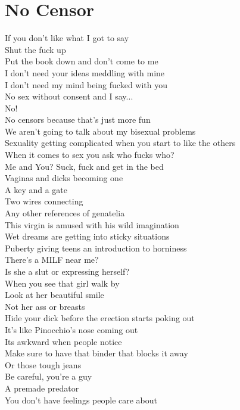 \documentclass[12pt, b5paper, oneside]{book}
\begin{document}
\section{No Censor}
If you don't like what I got to say
\\Shut the fuck up
\\Put the book down and don't come to me
\\I don't need your ideas meddling with mine
\\I don't need my mind being fucked with you
\\No sex without consent and I say...
\\No!
\\No censors because that's just more fun
\\We aren't going to talk about my bisexual problems
\\Sexuality getting complicated when you start to like the others
\\When it comes to sex you ask who fucks who?
\\Me and You? Suck, fuck and get in the bed
\\Vaginas and dicks becoming one
\\A key and a gate
\\Two wires connecting
\\Any other references of genatelia
\\This virgin is amused with his wild imagination
\\Wet dreams are getting into sticky situations
\\Puberty giving teens an introduction to horniness
\\There's a MILF near me?
\\Is she a slut or expressing herself?
\\When you see that girl walk by
\\Look at her beautiful smile
\\Not her ass or breasts
\\Hide your dick before the erection starts poking out
\\It's like Pinocchio's nose coming out
\\Its awkward when people notice
\\Make sure to have that binder that blocks it away
\\Or those tough jeans
\\Be careful, you're a guy
\\A premade predator
\\You don't have feelings people care about
\end{document}

